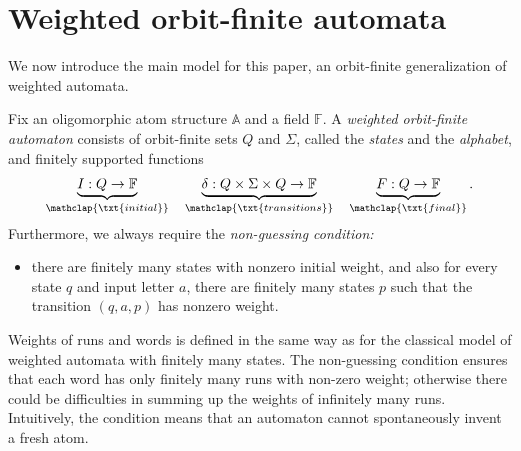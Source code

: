 \documentclass[10pt,a4paper]{amsart}
\numberwithin{equation}{section}
\newcommand{\myunderbrace}[2]{\underbrace{#1}_{\mathclap{\txt{\scriptsize #2}}}}
\newcommand{\atoms}{\mathbb A}
\newcommand{\field}{\mathbb F}
\begin{document}
\section{Weighted orbit-finite automata}\label{sec:wof-aut}
We now introduce the main model for this paper, an orbit-finite generalization of weighted automata.
\begin{definition}\label{def:weighted-orbit-finite} 
Fix an oligomorphic atom structure $\atoms$ and a field $\field$. 
    A \emph{weighted orbit-finite automaton} consists of orbit-finite sets $Q$ and $\Sigma$, called the \emph{states} and the {\em alphabet}, and finitely supported functions 
    \begin{align*}
        \myunderbrace{I : Q \to \field}{initial} 
        \quad 
        \myunderbrace{\delta : Q \times \Sigma \times Q \to \field}{transitions}
        \quad 
        \myunderbrace{F : Q \to \field}{final}.
    \end{align*}
    Furthermore, we always require the \emph{non-guessing condition:}
    \begin{itemize}
    \item[(*)]
        there are finitely many states with nonzero initial weight, and also for every state $q$ and input letter $a$, there are finitely many states $p$ such that the transition $(q,a,p)$ has nonzero weight.
    \end{itemize}
\end{definition}

Weights of runs and  words is defined in the same way as for the classical model of weighted automata with finitely many states. 
The non-guessing condition ensures that each word has only finitely many runs with non-zero weight; otherwise there could be difficulties in summing up the weights of infinitely many runs. Intuitively, the condition means that an automaton cannot spontaneously invent a fresh atom. 
\end{document}
